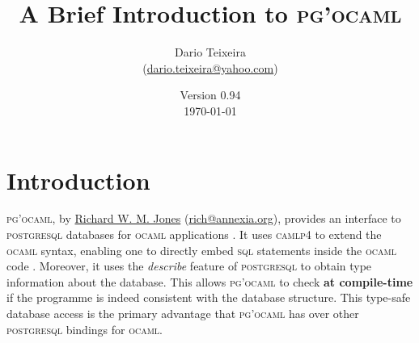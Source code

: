 \documentclass[11pt]{article}
\makeatletter
\newcommand{\ocaml}{\textsc{ocaml}\xspace}
\newcommand{\postgresql}{\textsc{postgresql}\xspace}
\newcommand{\sql}{\textsc{sql}\xspace}
\newcommand{\pgocaml}{\textsc{pg'ocaml}\xspace}
\newcommand{\camlp}{\textsc{camlp}{\scriptsize 4}\xspace}
\newcommand{\jonesemail}{rich@annexia.org}
\newcommand{\jones}{\href{mailto:\jonesemail}{Richard W. M. Jones} (\href{mailto:\jonesemail}{\jonesemail})}
\makeatother
\begin{document}
\renewcommand{\thefootnote}{\fnsymbol{footnote}}

\title{A Brief Introduction to \pgocaml\footnotemark[1]}
\author{Dario Teixeira\\\small(\href{mailto:dario.teixeira@yahoo.com}{dario.teixeira@yahoo.com})}
\date{Version 0.94\\\today}
\maketitle


\renewcommand{\thefootnote}{\arabic{footnote}}

\tableofcontents



\section{Introduction}
\label{sec:intro}

\pgocaml, by \jones, provides an interface to \postgresql databases for \ocaml
applications \cite{pgocaml,postgresql,ocaml}.  It uses \camlp to extend the
\ocaml syntax, enabling one to directly embed \sql statements inside the \ocaml
code \cite{camlp}.  Moreover, it uses the \emph{describe} feature of \postgresql to
obtain type information about the database.  This allows \pgocaml to check \textbf{at
compile-time} if the programme is indeed consistent with the database structure.
This type-safe database access is the primary advantage that \pgocaml has over other
\postgresql bindings for \ocaml.
\end{document}
